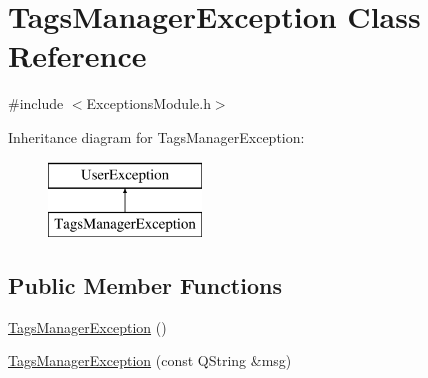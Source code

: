 \hypertarget{class_tags_manager_exception}{\section{Tags\-Manager\-Exception Class Reference}
\label{class_tags_manager_exception}
}


{\ttfamily \#include $<$Exceptions\-Module.\-h$>$}

Inheritance diagram for Tags\-Manager\-Exception\-:\begin{figure}[H]
\begin{center}
\leavevmode
\includegraphics[height=2.000000cm]{class_tags_manager_exception}
\end{center}
\end{figure}
\subsection*{Public Member Functions}
\begin{DoxyCompactItemize}
\item 
\hyperlink{class_tags_manager_exception_aa88d51a2b28449e6e97c463b6236b972}{Tags\-Manager\-Exception} ()
\item 
\hyperlink{class_tags_manager_exception_a13cde2b43de8d175bf3cade03e767098}{Tags\-Manager\-Exception} (const Q\-String \&msg)
\end{DoxyCompactItemize}


